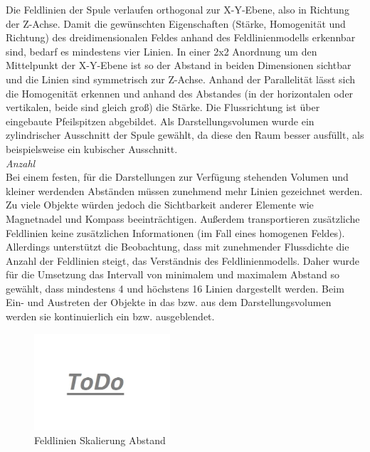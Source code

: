 Die Feldlinien der Spule verlaufen orthogonal zur X-Y-Ebene, also in Richtung der Z-Achse. Damit die gewünschten Eigenschaften (Stärke, Homogenität und Richtung) des dreidimensionalen Feldes anhand des Feldlinienmodells erkennbar sind, bedarf es mindestens vier Linien. In einer 2x2 Anordnung um den Mittelpunkt der X-Y-Ebene ist so der Abstand in beiden Dimensionen sichtbar und die Linien sind symmetrisch zur Z-Achse. Anhand der Parallelität lässt sich die Homogenität erkennen und anhand des Abstandes (in der horizontalen oder vertikalen, beide sind gleich groß) die Stärke. Die Flussrichtung ist über eingebaute Pfeilspitzen abgebildet. Als Darstellungsvolumen wurde ein zylindrischer Ausschnitt der Spule gewählt, da diese den Raum besser ausfüllt, als beispielsweise ein kubischer Ausschnitt.\\

\textit{Anzahl}\\
Bei einem festen, für die Darstellungen zur Verfügung stehenden Volumen und kleiner werdenden Abständen müssen zunehmend mehr Linien gezeichnet werden. Zu viele Objekte würden jedoch die Sichtbarkeit anderer Elemente wie Magnetnadel und Kompass beeinträchtigen. Außerdem transportieren zusätzliche Feldlinien keine zusätzlichen Informationen (im Fall eines homogenen Feldes). Allerdings unterstützt die Beobachtung, dass mit zunehmender Flussdichte die Anzahl der Feldlinien steigt, das Verständnis des Feldlinienmodells. Daher wurde für die Umsetzung das Intervall von minimalem und maximalem Abstand so gewählt, dass mindestens 4 und höchstens 16 Linien dargestellt werden. Beim Ein- und Austreten der Objekte in das bzw. aus dem Darstellungsvolumen werden sie kontinuierlich ein bzw. ausgeblendet.\\

\begin{figure}[H]
	\centering
	\includegraphics[width=0.45\textwidth]{images/todo.jpg}
	\caption{Feldlinien Skalierung Abstand}
	\label{img:mfield-lines-scaling}
\end{figure}

